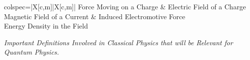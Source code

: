 
\begin{table}[h!]
	\color{body}
	\begin{tblr}{colspec={|X[c,m]|X[c,m]|}}
		\hline
		Force Moving on a Charge & Electric Field of a Charge \\
		\hline
		Magnetic Field of a Current & Induced Electromotive Force \\
		\hline
		 Energy Density in the Field \\
		\hline
	\end{tblr}
	\caption{\label{tab:important_definitions_qm}\textit{Important Definitions Involved in Classical Physics that will be Relevant for Quantum Physics.}}
\end{table}